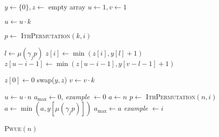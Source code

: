 \documentclass[a4paper, 11pt, ngerman]{article}
\begin{document}
\begin{algorithm}
    $y \gets \{0\}, z \gets$ empty array \;
    $u \gets 1, v \gets 1$ \;

    {
        $u \gets u \cdot k$ \;

        {
            $p \gets$ \textsc{IthPermutation}$(k, i)$ \;

             {
                $l \gets \mu(\gamma_j p)$ \;
                $z[i] \gets \min(z[i], y[l] + 1)$ \;
                $z[u - i - 1] \gets \min(z[u - i - 1], y[v - l - 1] + 1)$ \;
            }
        }

        $z[0] \gets 0$ \;
        swap($y, z$) \;
        $v \gets v \cdot k$ \;
    }
    $u \gets u \cdot n$ \;
    $a_{\max} \gets 0$, \emph{example} $\gets 0$ \;
    {
        $a \gets n$ \;
        $p \gets$ \textsc{IthPermutation}$(n, i)$ \;
        {
            $a \gets \min(a, y[\mu(\gamma_j p)])$ \;
        }
        {
            $a_{\max} \gets a$ \;
            \emph{example} $\gets i$ \;
        }
    }

     \;

    \caption{\textsc{Pwue}$(n)$}
\end{algorithm}
\end{document}
